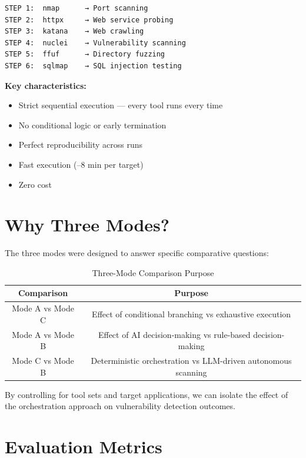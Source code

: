 \documentclass[12pt,a4paper,oneside]{book}
\begin{document}
\begin{verbatim}
STEP 1:  nmap      → Port scanning
STEP 2:  httpx     → Web service probing
STEP 3:  katana    → Web crawling
STEP 4:  nuclei    → Vulnerability scanning
STEP 5:  ffuf      → Directory fuzzing
STEP 6:  sqlmap    → SQL injection testing
\end{verbatim}

\textbf{Key characteristics:}
\begin{itemize}
    \item Strict sequential execution — every tool runs every time
    \item No conditional logic or early termination
    \item Perfect reproducibility across runs
    \item Fast execution (–8 min per target)
    \item Zero cost
\end{itemize}

\section{Why Three Modes?}

The three modes were designed to answer specific comparative questions:

\begin{table}[h]
\centering
\caption{Three-Mode Comparison Purpose}
\label{tab:mode_comparison}
\begin{tabular}{|c|c|}
\hline
\textbf{Comparison} & \textbf{Purpose} \\ \hline
Mode A vs Mode C & Effect of conditional branching vs exhaustive execution \\ \hline
Mode A vs Mode B & Effect of AI decision-making vs rule-based decision-making \\ \hline
Mode C vs Mode B & Deterministic orchestration vs LLM-driven autonomous scanning \\ \hline
\end{tabular}
\end{table}

By controlling for tool sets and target applications, we can isolate the effect of the orchestration approach on vulnerability detection outcomes.

\section{Evaluation Metrics}
\end{document}
